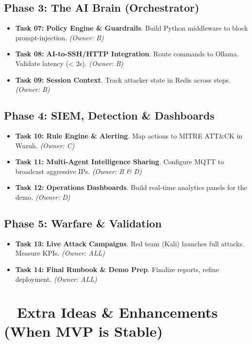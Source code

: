 \documentclass[11pt,a4paper]{article}
\begin{document}
\subsection*{Phase 3: The AI Brain (Orchestrator)}
\begin{itemize}[label=\faRegSquare]
    \item \textbf{Task 07: Policy Engine \& Guardrails}. Build Python middleware to block prompt-injection. \textit{(Owner: B)}
    \item \textbf{Task 08: AI-to-SSH/HTTP Integration}. Route commands to Ollama. Validate latency (< 2s). \textit{(Owner: B)}
    \item \textbf{Task 09: Session Context}. Track attacker state in Redis across steps. \textit{(Owner: B)}
\end{itemize}

\subsection*{Phase 4: SIEM, Detection \& Dashboards}
\begin{itemize}[label=\faRegSquare]
    \item \textbf{Task 10: Rule Engine \& Alerting}. Map actions to MITRE ATT\&CK in Wazuh. \textit{(Owner: C)}
    \item \textbf{Task 11: Multi-Agent Intelligence Sharing}. Configure MQTT to broadcast aggressive IPs. \textit{(Owner: B \& D)}
    \item \textbf{Task 12: Operations Dashboards}. Build real-time analytics panels for the demo. \textit{(Owner: D)}
\end{itemize}

\subsection*{Phase 5: Warfare \& Validation}
\begin{itemize}[label=\faRegSquare]
    \item \textbf{Task 13: Live Attack Campaigns}. Red team (Kali) launches full attacks. Measure KPIs. \textit{(Owner: ALL)}
    \item \textbf{Task 14: Final Runbook \& Demo Prep}. Finalize reports, refine deployment. \textit{(Owner: ALL)}
\end{itemize}

\section*{\faLightbulb~ Extra Ideas \& Enhancements (When MVP is Stable)}
\end{document}
